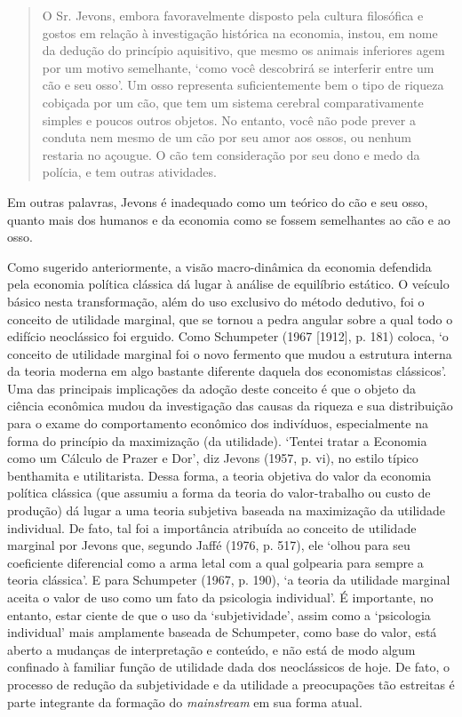 \documentclass[12pt]{article}
\begin{document}
\begin{quote}
O Sr. Jevons, embora favoravelmente disposto pela cultura filosófica e gostos em relação à investigação histórica na economia, instou, em nome da dedução do princípio aquisitivo, que mesmo os animais inferiores agem por um motivo semelhante, ‘como você descobrirá se interferir entre um cão e seu osso’. Um osso representa suficientemente bem o tipo de riqueza cobiçada por um cão, que tem um sistema cerebral comparativamente simples e poucos outros objetos. No entanto, você não pode prever a conduta nem mesmo de um cão por seu amor aos ossos, ou nenhum restaria no açougue. O cão tem consideração por seu dono e medo da polícia, e tem outras atividades.
\end{quote}

Em outras palavras, Jevons é inadequado como um teórico do cão e seu osso, quanto mais dos humanos e da economia como se fossem semelhantes ao cão e ao osso.

Como sugerido anteriormente, a visão macro-dinâmica da economia defendida pela economia política clássica dá lugar à análise de equilíbrio estático. O veículo básico nesta transformação, além do uso exclusivo do método dedutivo, foi o conceito de utilidade marginal, que se tornou a pedra angular sobre a qual todo o edifício neoclássico foi erguido. Como Schumpeter (1967 [1912], p. 181) coloca, ‘o conceito de utilidade marginal foi o novo fermento que mudou a estrutura interna da teoria moderna em algo bastante diferente daquela dos economistas clássicos’. Uma das principais implicações da adoção deste conceito é que o objeto da ciência econômica mudou da investigação das causas da riqueza e sua distribuição para o exame do comportamento econômico dos indivíduos, especialmente na forma do princípio da maximização (da utilidade). ‘Tentei tratar a Economia como um Cálculo de Prazer e Dor’, diz Jevons (1957, p. vi), no estilo típico benthamita e utilitarista. Dessa forma, a teoria objetiva do valor da economia política clássica (que assumiu a forma da teoria do valor-trabalho ou custo de produção) dá lugar a uma teoria subjetiva baseada na maximização da utilidade individual. De fato, tal foi a importância atribuída ao conceito de utilidade marginal por Jevons que, segundo Jaffé (1976, p. 517), ele ‘olhou para seu coeficiente diferencial como a arma letal com a qual golpearia para sempre a teoria clássica’. E para Schumpeter (1967, p. 190), ‘a teoria da utilidade marginal aceita o valor de uso como um fato da psicologia individual’. É importante, no entanto, estar ciente de que o uso da ‘subjetividade’, assim como a ‘psicologia individual’ mais amplamente baseada de Schumpeter, como base do valor, está aberto a mudanças de interpretação e conteúdo, e não está de modo algum confinado à familiar função de utilidade dada dos neoclássicos de hoje. De fato, o processo de redução da subjetividade e da utilidade a preocupações tão estreitas é parte integrante da formação do \textit{mainstream} em sua forma atual.
\end{document}
